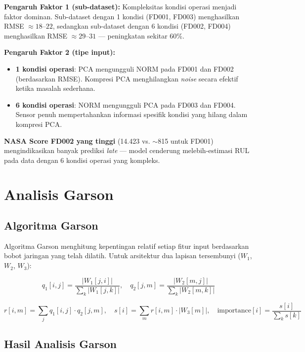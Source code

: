 \documentclass[11pt,a4paper]{article}
\begin{document}
\textbf{Pengaruh Faktor 1 (sub-dataset):}
Kompleksitas kondisi operasi menjadi faktor dominan.
Sub-dataset dengan 1 kondisi (FD001, FD003) menghasilkan RMSE $\approx 18$--$22$,
sedangkan sub-dataset dengan 6 kondisi (FD002, FD004) menghasilkan RMSE $\approx 29$--$31$
--- peningkatan sekitar 60\%.

\textbf{Pengaruh Faktor 2 (tipe input):}
\begin{itemize}[noitemsep]
  \item \textbf{1 kondisi operasi}: PCA mengungguli NORM pada FD001 dan FD002 (berdasarkan RMSE).
    Kompresi PCA menghilangkan \textit{noise} secara efektif ketika masalah sederhana.
  \item \textbf{6 kondisi operasi}: NORM mengungguli PCA pada FD003 dan FD004.
    Sensor penuh mempertahankan informasi spesifik kondisi yang hilang dalam kompresi PCA.
\end{itemize}

\textbf{NASA Score FD002 yang tinggi} (14.423 vs. $\sim$815 untuk FD001)
mengindikasikan banyak prediksi \textit{late} --- model cenderung melebih-estimasi RUL
pada data dengan 6 kondisi operasi yang kompleks.

\section{Analisis Garson}

\subsection{Algoritma Garson}

Algoritma Garson \cite{garson1991} menghitung kepentingan relatif setiap fitur input
berdasarkan bobot jaringan yang telah dilatih. Untuk arsitektur dua lapisan
tersembunyi ($W_1$, $W_2$, $W_3$):

\begin{equation}
  q_1[i,j] = \frac{|W_1[j,i]|}{\sum_k |W_1[j,k]|}, \quad
  q_2[j,m] = \frac{|W_2[m,j]|}{\sum_k |W_2[m,k]|}
\end{equation}

\begin{equation}
  r[i,m] = \sum_j q_1[i,j] \cdot q_2[j,m], \quad
  s[i]   = \sum_m r[i,m] \cdot |W_3[m]|, \quad
  \text{importance}[i] = \frac{s[i]}{\sum_k s[k]}
\end{equation}

\subsection{Hasil Analisis Garson}
\end{document}
